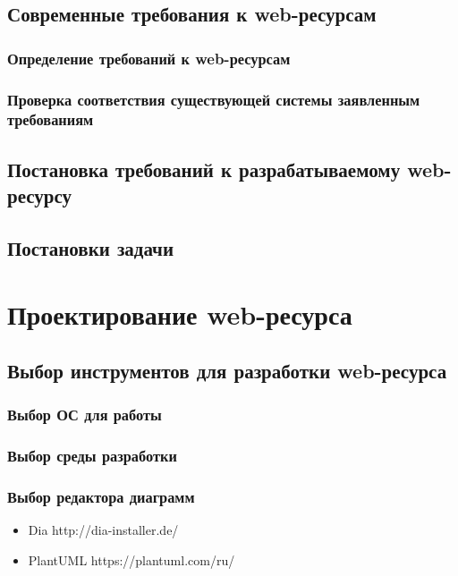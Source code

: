     \subsection{Современные требования к web-ресурсам}
        \subsubsection{Определение требований к web-ресурсам}
        \subsubsection{Проверка соответствия существующей системы заявленным требованиям}
    
    \subsection{Постановка требований к разрабатываемому web-ресурсу}
    \subsection{Постановки задачи}
    
\section{Проектирование web-ресурса}
    \subsection{Выбор инструментов для разработки web-ресурса}
        \subsubsection{Выбор ОС для работы}

        \subsubsection{Выбор среды разработки}
            
        \subsubsection{Выбор редактора диаграмм}
            \begin{itemize}
                \item Dia   http://dia-installer.de/
                \item PlantUML  https://plantuml.com/ru/
            \end{itemize}
        
